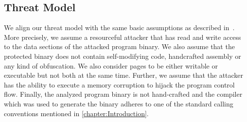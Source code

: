 % 




\subsection{Threat Model}
\label{Adversary Model}

We align our threat model with the same basic assumptions as described in~\cite{veen:typearmor}. 
More precisely, we assume a resourceful attacker that has read and write access to the data 
sections of the attacked program binary. We also assume that the protected binary does not contain 
self-modifying code, handcrafted assembly or any kind of obfuscation. We also consider pages 
to be either writable or executable but not both at the same time. Further, we assume 
that the attacker has the ability to execute a memory corruption to hijack the program
control flow. Finally, the analyzed program binary is not hand-crafted and the compiler
which was used to generate the binary adheres to one of the 
standard calling conventions mentioned in \cref{chapter:Introduction}.
